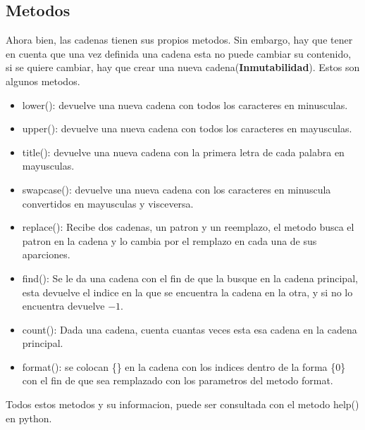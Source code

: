 \documentclass{article}
\begin{document}
\subsection{Metodos}
Ahora bien, las cadenas tienen sus propios metodos. Sin embargo, hay que tener en cuenta que una vez definida una cadena esta no puede cambiar su contenido, si se quiere cambiar, hay que crear una nueva cadena(\textbf{Inmutabilidad}). Estos son algunos metodos.
\begin{itemize}
    \item lower(): devuelve una nueva cadena con todos los caracteres en minusculas.
    \item upper(): devuelve una nueva cadena con todos los caracteres en mayusculas.
    \item title(): devuelve una nueva cadena con la primera letra de cada palabra en mayusculas.
    \item swapcase(): devuelve una nueva cadena con los caracteres en minuscula convertidos en mayusculas y visceversa.
    \item replace(): Recibe dos cadenas, un patron y un reemplazo, el metodo busca el patron en la cadena y lo cambia por el remplazo en cada una de sus aparciones. 
    \item find(): Se le da una cadena con el fin de que la busque en la cadena principal, esta devuelve el indice en la que se encuentra la cadena en la otra, y si no lo encuentra devuelve \(-1\).
    \item count(): Dada una cadena, cuenta cuantas veces esta esa cadena en la cadena principal.
    \item format(): se colocan \{\} en la cadena con los indices dentro de la forma \{0\} con el fin de que sea remplazado con los parametros del metodo format.
\end{itemize}
Todos estos metodos y su informacion, puede ser consultada con el metodo help() en python.
\end{document}
